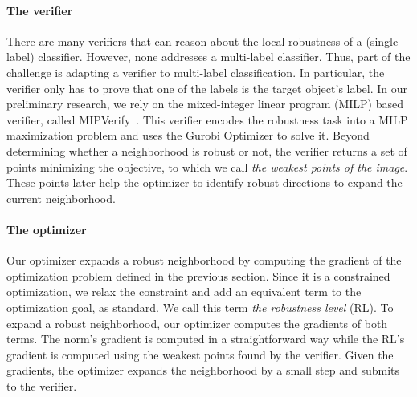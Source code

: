 \paragraph{The verifier}
There are many verifiers that can reason about the local robustness of a (single-label) classifier. However, none addresses a multi-label classifier. Thus, part of the challenge is adapting a verifier to multi-label classification. 
In particular, the verifier only has to prove that one of the labels is the target object's label. %
    In our preliminary research, we rely on the mixed-integer linear program (MILP) based verifier, called MIPVerify~\cite{MIPVERIFY}. This verifier encodes the robustness task into a MILP maximization problem and uses the Gurobi Optimizer to solve it.
    Beyond determining whether a neighborhood is robust or not, the verifier returns a set of points minimizing the objective, to which we call \emph{the weakest points of the image}. These points later help the optimizer to identify robust directions to expand the current neighborhood.
    
    \paragraph{The optimizer}
    Our optimizer expands a robust neighborhood by computing the gradient of the optimization problem defined in the previous section.
    Since it is a constrained optimization, we relax the constraint and add an equivalent term to the optimization goal, as standard.
    We call this term \emph{the robustness level} (RL).
    To expand a robust neighborhood, our optimizer 
    computes the gradients of both terms.
    The norm's gradient is computed in a straightforward way while the RL's gradient is computed using the weakest points found by the verifier.
    Given the gradients, the optimizer expands the neighborhood by a small step and submits to the verifier. %
    
